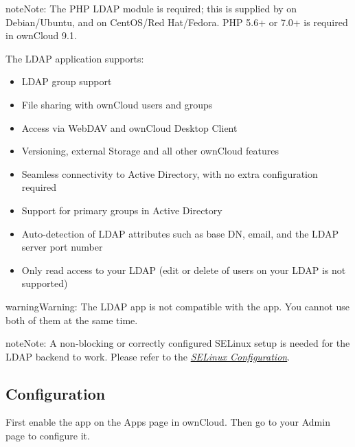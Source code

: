\documentclass[letterpaper,10pt,english]{sphinxmanual}
\begin{document}
\begin{notice}{note}{Note:}
The PHP LDAP module is required; this is supplied by  on
Debian/Ubuntu, and  on CentOS/Red Hat/Fedora. PHP 5.6+ or 7.0+ is
required in ownCloud 9.1.
\end{notice}

The LDAP application supports:
\begin{itemize}
\item {} 
LDAP group support

\item {} 
File sharing with ownCloud users and groups

\item {} 
Access via WebDAV and ownCloud Desktop Client

\item {} 
Versioning, external Storage and all other ownCloud features

\item {} 
Seamless connectivity to Active Directory, with no extra configuration
required

\item {} 
Support for primary groups in Active Directory

\item {} 
Auto-detection of LDAP attributes such as base DN, email, and the LDAP server
port number

\item {} 
Only read access to your LDAP (edit or delete of users on your LDAP is not
supported)

\end{itemize}

\begin{notice}{warning}{Warning:}
The LDAP app is not compatible with the  app. You cannot use both of them at the same time.
\end{notice}

\begin{notice}{note}{Note:}
A non-blocking or correctly configured SELinux setup is needed
for the LDAP backend to work. Please refer to the {\hyperref[installation/selinux_configuration:selinux\string-config\string-label]{\emph{SELinux Configuration}}}.
\end{notice}


\subsection{Configuration}
\label{configuration_user/user_auth_ldap:configuration}
First enable the  app on the Apps page in
ownCloud. Then go to your Admin page to configure it.
\end{document}
